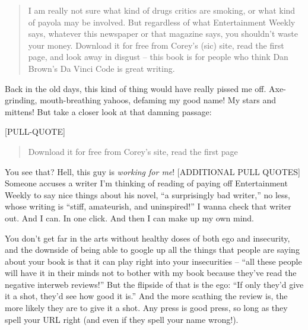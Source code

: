 \begin{enumerate}
  
  \begin{quote}
  I am really not sure what kind of drugs critics are smoking, or
  what kind of payola may be involved. But regardless of what
  Entertainment Weekly says, whatever this newspaper or that magazine
  says, you shouldn't waste your money. Download it for free from
  Corey's (sic) site, read the first page, and look away in disgust
  -- this book is for people who think Dan Brown's Da Vinci Code is
  great writing.
  \end{quote}
  
  Back in the old days, this kind of thing would have really pissed
  me off. Axe-grinding, mouth-breathing yahoos, defaming my good
  name! My stars and mittens! But take a closer look at that damning
  passage:
  
  [PULL-QUOTE]
  
  \begin{quote}
  Download it for free from Corey's site, read the first page
  \end{quote}
  
  You see that? Hell, this guy is \emph{working for me}!
  [ADDITIONAL PULL QUOTES] Someone accuses a writer I'm thinking of
  reading of paying off Entertainment Weekly to say nice things about
  his novel, ``a surprisingly bad writer,'' no less, whose writing is
  ``stiff, amateurish, and uninspired!'' I wanna check that writer out.
  And I can. In one click. And then I can make up my own mind.
  
  You don't get far in the arts without healthy doses of both ego and
  insecurity, and the downside of being able to google up all the
  things that people are saying about your book is that it can play
  right into your insecurities -- ``all these people will have it in
  their minds not to bother with my book because they've read the
  negative interweb reviews!'' But the flipside of that is the ego:
  ``If only they'd give it a shot, they'd see how good it is.'' And the
  more scathing the review is, the more likely they are to give it a
  shot. Any press is good press, so long as they spell your URL right
  (and even if they spell your name wrong!).
  

\end{enumerate}
